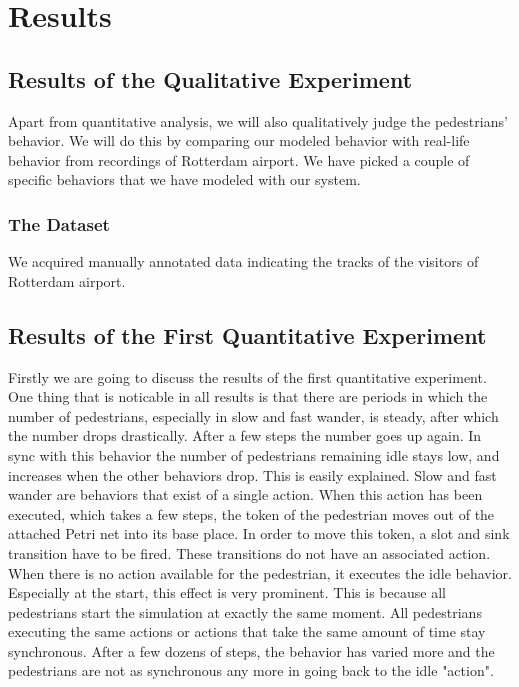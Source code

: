 \documentclass[11pt]{book}
\begin{document}
\graphicspath{{.}{../results}}

\chapter{Results}
\label{chap:results}

\section{Results of the Qualitative Experiment}
\label{sec:qualitativeresults}
Apart from quantitative analysis, we will also qualitatively judge the pedestrians' behavior. We will do this by comparing our modeled behavior with real-life behavior from recordings of Rotterdam airport. We have picked a couple of specific behaviors that we have modeled with our system.

\subsection{The Dataset}
We acquired manually annotated data indicating the tracks of the visitors of Rotterdam airport. 







\section{Results of the First Quantitative Experiment}
\label{sec:firstquantitative}
Firstly we are going to discuss the results of the first quantitative experiment. One thing that is noticable in all results is that there are periods in which the number of pedestrians, especially in slow and fast wander, is steady, after which the number drops drastically. After a few steps the number goes up again. In sync with this behavior the number of pedestrians remaining idle stays low, and increases when the other behaviors drop. This is easily explained. Slow and fast wander are behaviors that exist of a single action. When this action has been executed, which takes a few steps, the token of the pedestrian moves out of the attached Petri net into its base place. In order to move this token, a slot and sink transition have to be fired. These transitions do not have an associated action. When there is no action available for the pedestrian, it executes the idle behavior. Especially at the start, this effect is very prominent. This is because all pedestrians start the simulation at exactly the same moment. All pedestrians executing the same actions or actions that take the same amount of time stay synchronous. After a few dozens of steps, the behavior has varied more and the pedestrians are not as synchronous any more in going back to the idle "action".
\end{document}
